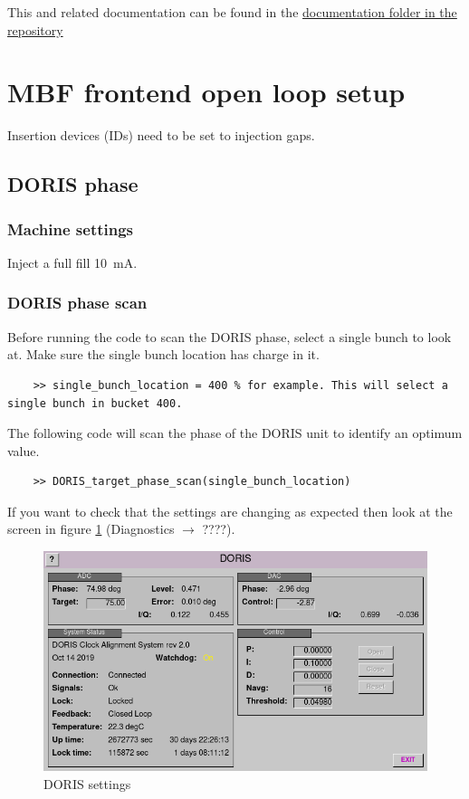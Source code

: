 \documentclass{report}
\begin{document}
This and related documentation can be found in the \href{https://github.com/alunmorgan/Multi-bunch-feedback-applications/Documentation}{documentation folder in the repository}

\section{MBF frontend open loop setup}
 Insertion devices (IDs) need to be set to injection gaps.
\subsection{DORIS phase}
\subsubsection{Machine settings}
Inject a full fill 10~mA.
\subsubsection{DORIS phase scan}
Before running the code to scan the DORIS phase, select a single bunch to look at.
Make sure the single bunch location has charge in it.
\begin{verbatim}
    >> single_bunch_location = 400 % for example. This will select a single bunch in bucket 400.
\end{verbatim}
The following code will scan the phase of the DORIS unit to identify an optimum value.
\begin{verbatim}
    >> DORIS_target_phase_scan(single_bunch_location) 
\end{verbatim}
If you want to check that the settings are changing as expected then look at the screen in figure \ref{fig:DORIS_settings} (Diagnostics $\rightarrow$ {\color{red}????}).
\begin{figure}
    \centering
    \includegraphics[width=0.8\linewidth]{DORIS_settings.png}
    \caption{DORIS settings}
    \label{fig:DORIS_settings}
\end{figure}
\end{document}

